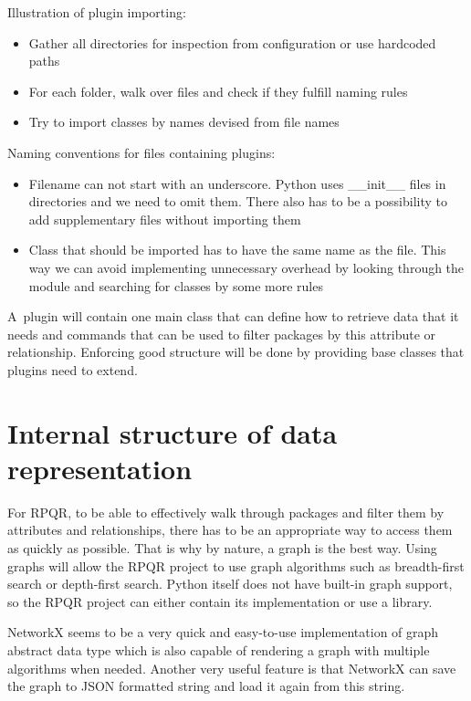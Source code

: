 Illustration of plugin importing:
\begin{itemize}
  \item Gather all directories for inspection from configuration or use hardcoded paths
  \item For each folder, walk over files and check if they fulfill naming rules
  \item Try to import classes by names devised from file names
\end{itemize}

Naming conventions for files containing plugins:
\begin{itemize}
  \item Filename can not start with an underscore. Python uses \_\_init\_\_ files
  in directories and we need to omit them. There also has to be a possibility to add supplementary files without importing them
  \item Class that should be imported has to have the same name as the file. This way we can avoid
  implementing unnecessary overhead by looking through the module and searching for classes by some
  more rules
\end{itemize}

A~plugin will contain one main class that can define how to retrieve data that it needs and commands
that can be used to filter packages by this attribute or relationship. Enforcing good structure
will be done by providing base classes that plugins need to extend.

\newpage

\section{Internal structure of data representation}
For RPQR, to be able to effectively walk through packages and filter them by attributes and relationships,
there has to be an appropriate way to access them as quickly as possible. That is why by nature, a graph
is the best way. Using graphs will allow the RPQR project to use graph algorithms such as breadth-first search
or depth-first search. Python itself does not have built-in graph support, so the RPQR project can either
contain its implementation or use a library.

NetworkX\cite{NetworkX} seems to be a very quick and easy-to-use implementation of graph abstract data type which is
also capable of rendering a graph with multiple algorithms when needed. Another very useful feature
is that NetworkX can save the graph to JSON formatted string and load it again from this string.

